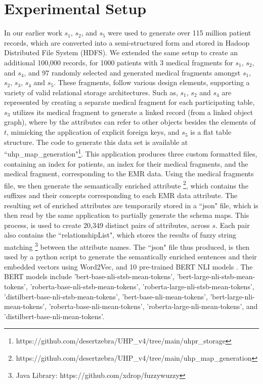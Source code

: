\documentclass{ieeeaccess}
\begin{document}
\section{Experimental Setup}
\label{experimentalSetup}
In our earlier work \cite{Satti2020} $s_1$, $s_2$, and $s_5$ were used to generate over 115 million patient records, which are converted into a semi-structured form and stored in Hadoop Distributed File System (HDFS). We extended the same setup to create an additional 100,000 records, for 1000 patients with 3 medical fragments for $s_1$, $s_2$, and $s_4$, and 97 randomly selected and generated medical fragments amongst $s_1$, $s_2$, $s_3$, $s_4$ and $s_5$. These fragments, follow various design elements, supporting a variety of valid relational storage architectures. Such as, $s_1$, $s_2$ and $s_4$ are represented by creating a separate medical fragment for each participating table, $s_3$ utilizes its medical fragment to generate a linked record (from a linked object graph), where by the attributes can refer to other objects besides the elements of $t$, mimicking the application of explicit foreign keys, and $s_5$ is a flat table structure. The code to generate this data set is available at ``uhp\_map\_generation"\footnote{https://github.com/desertzebra/UHP\_v4/tree/main/uhpr\_storage}. This application produces three custom formatted files, containing an index for patients, an index for their medical fragments, and the medical fragment, corresponding to the EMR data. Using the medical fragments file, we then generate the semantically enriched attribute \footnote{https://github.com/desertzebra/UHP\_v4/tree/main/uhp\_map\_generation}, which contains the suffixes and their concepts corresponding to each EMR data attribute. The resulting set of enriched attributes are temporarily stored in a ``json" file, which is then read by the same application to partially generate the schema maps. This process, is used to create 20,349 distinct pairs of attributes, across $s$. Each pair also contains the ``relationshipList", which stores the results of fuzzy string matching\cite{FuzzyWuzzy} \footnote{Java Library: https://github.com/xdrop/fuzzywuzzy} between the attribute names. 
The ``json" file thus produced, is then used by a python script to generate the semantically enriched sentences and their embedded vectors using Word2Vec, and 10 pre-trained BERT NLI models \cite{reimers-2019-sentence-bert}. The BERT models include 'bert-base-nli-stsb-mean-tokens', 'bert-large-nli-stsb-mean-tokens', 'roberta-base-nli-stsb-mean-tokens', 'roberta-large-nli-stsb-mean-tokens', 'distilbert-base-nli-stsb-mean-tokens', 'bert-base-nli-mean-tokens', 'bert-large-nli-mean-tokens', 'roberta-base-nli-mean-tokens', 'roberta-large-nli-mean-tokens', and 'distilbert-base-nli-mean-tokens'. 
\end{document}
